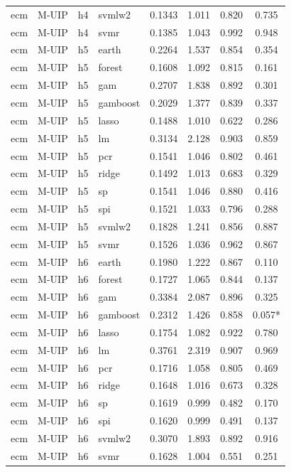 \begin{ThreePartTable}
\begin{longtable}[t]{llclcccc}
ecm & M-UIP & h4 & svmlw2 & 0.1343 & 1.011 & 0.820 & 0.735\\
ecm & M-UIP & h4 & svmr & 0.1385 & 1.043 & 0.992 & 0.948\\
\addlinespace
ecm & M-UIP & h5 & earth & 0.2264 & 1.537 & 0.854 & 0.354\\
ecm & M-UIP & h5 & forest & 0.1608 & 1.092 & 0.815 & 0.161\\
ecm & M-UIP & h5 & gam & 0.2707 & 1.838 & 0.892 & 0.301\\
ecm & M-UIP & h5 & gamboost & 0.2029 & 1.377 & 0.839 & 0.337\\
ecm & M-UIP & h5 & lasso & 0.1488 & 1.010 & 0.622 & 0.286\\
ecm & M-UIP & h5 & lm & 0.3134 & 2.128 & 0.903 & 0.859\\
ecm & M-UIP & h5 & pcr & 0.1541 & 1.046 & 0.802 & 0.461\\
ecm & M-UIP & h5 & ridge & 0.1492 & 1.013 & 0.683 & 0.329\\
ecm & M-UIP & h5 & sp & 0.1541 & 1.046 & 0.880 & 0.416\\
ecm & M-UIP & h5 & spi & 0.1521 & 1.033 & 0.796 & 0.288\\
ecm & M-UIP & h5 & svmlw2 & 0.1828 & 1.241 & 0.856 & 0.887\\
ecm & M-UIP & h5 & svmr & 0.1526 & 1.036 & 0.962 & 0.867\\
\addlinespace
ecm & M-UIP & h6 & earth & 0.1980 & 1.222 & 0.867 & 0.110\\
ecm & M-UIP & h6 & forest & 0.1727 & 1.065 & 0.844 & 0.137\\
ecm & M-UIP & h6 & gam & 0.3384 & 2.087 & 0.896 & 0.325\\
ecm & M-UIP & h6 & gamboost & 0.2312 & 1.426 & 0.858 & 0.057*\\
ecm & M-UIP & h6 & lasso & 0.1754 & 1.082 & 0.922 & 0.780\\
ecm & M-UIP & h6 & lm & 0.3761 & 2.319 & 0.907 & 0.969\\
ecm & M-UIP & h6 & pcr & 0.1716 & 1.058 & 0.805 & 0.469\\
ecm & M-UIP & h6 & ridge & 0.1648 & 1.016 & 0.673 & 0.328\\
ecm & M-UIP & h6 & sp & 0.1619 & 0.999 & 0.482 & 0.170\\
ecm & M-UIP & h6 & spi & 0.1620 & 0.999 & 0.491 & 0.137\\
ecm & M-UIP & h6 & svmlw2 & 0.3070 & 1.893 & 0.892 & 0.916\\
ecm & M-UIP & h6 & svmr & 0.1628 & 1.004 & 0.551 & 0.251\\

\end{longtable}
\end{ThreePartTable}
